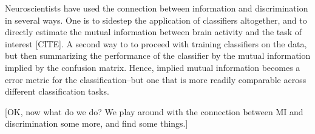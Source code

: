 Neuroscientists have used the connection between information and
discrimination in several ways.  One is to sidestep the application of
classifiers altogether, and to directly estimate the mutual
information between brain activity and the task of interest [CITE].  A
second way to to proceed with training classifiers on the data, but
then summarizing the performance of the classifier by the mutual
information implied by the confusion matrix.  Hence, implied mutual
information becomes a error metric for the classification--but one
that is more readily comparable across different classification tasks.

[OK, now what do we do?  We play around with the connection between MI
  and discrimination some more, and find some things.]




